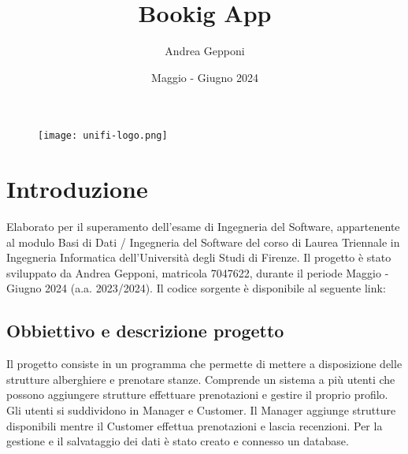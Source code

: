 \documentclass{article}
\title{Bookig App}
\author{Andrea Gepponi}
\date{Maggio - Giugno 2024}
\begin{document}
\maketitle

\begin{figure}[h!]
    \centering
    \texttt{[image: unifi-logo.png]}
\end{figure}

\newpage

\renewcommand{\contentsname}{Index}
\tableofcontents

\newpage

\section{Introduzione}
Elaborato per il superamento dell’esame di Ingegneria del Software, appartenente al modulo Basi di Dati / Ingegneria del Software del corso di Laurea Triennale in Ingegneria Informatica dell’Università degli Studi di Firenze.
\vspace{4mm}
Il progetto è stato sviluppato da Andrea Gepponi, matricola 7047622, durante il periode Maggio - Giugno 2024 (a.a. 2023/2024).
\vspace{4mm}
\newline
Il codice sorgente è disponibile al seguente link:

\vspace{4mm}
\subsection{Obbiettivo e descrizione progetto}
Il progetto consiste in un programma che permette di mettere a disposizione delle strutture alberghiere e prenotare  stanze.
\vspace{0mm}
\newline
Comprende un sistema a più utenti che possono aggiungere strutture effettuare prenotazioni e gestire il proprio profilo.
\vspace{0mm}
\newline
Gli utenti si suddividono in Manager e Customer.
\vspace{0mm}
\newline
Il Manager aggiunge strutture disponibili mentre il Customer effettua prenotazioni e lascia recenzioni.
\vspace{0mm}
\newline
Per la gestione e il salvataggio dei dati è stato creato e connesso un database.
\vspace{4mm}
\end{document}
